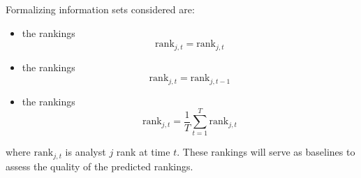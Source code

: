 \documentclass[a4paper,twoside,12pt,openright,notitlepage]{report}\usepackage[]{graphicx}\usepackage[]{color}
\begin{document}
Formalizing information sets considered are:
\begin{itemize}
	\item  the \tr{} rankings%
	\begin{equation}
		\label{rank:true}
		\mathrm{rank}_{j,t}=\mathrm{rank}_{j,t}
	\end{equation}

	\item  the \naive{} rankings %
	\begin{equation}
		\label{rank:naive}
		\mathrm{rank}_{j,t}=\mathrm{rank}_{j,t-1}
	\end{equation}

	\item  the   rankings%
	\begin{equation}
		\label{rank:default}
		\mathrm{rank}_{j,t} = \frac{1}{T} \sum_{t=1}^{T} \mathrm{rank}_{j,t}
	\end{equation}

\end{itemize}
where $\mathrm{rank}_{j,t}$ is analyst $j$  rank at time $t$. These rankings will serve as  baselines to assess the quality of the predicted rankings.
\end{document}
